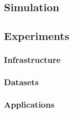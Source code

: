 \documentclass{IEEEtran}
\begin{document}


\subsection{Simulation} %





\subsection{Experiments} %

\subsubsection{Infrastructure} %


\subsubsection{Datasets} %


\subsubsection{Applications} %





\end{document}

